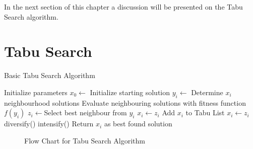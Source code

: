 In the next section of this chapter a discussion will be presented on the Tabu Search algorithm.

\section{Tabu Search}
\label{sec:tabusearch}
\begin{algorithm}
\caption{Basic Tabu Search Algorithm\cite{TabuRCAProblem,TabuMontemanniSmith}}
\label{alg:TS}
	\begin{algorithmic}[1]
		\STATE Initialize parameters
		\STATE $x_0 \leftarrow$ Initialize starting solution
			\STATE $y_i \leftarrow$ Determine $x_i$ neighbourhood solutions 
			\STATE Evaluate neighbouring solutions with fitness function $f(y_i)$
			\STATE $z_i \leftarrow$Select best neighbour from $y_i$
					\STATE $x_i \leftarrow z_i$
				\ENDIF
			\ELSE
				\STATE Add $x_i$ to Tabu List
				\STATE $x_i \leftarrow z_i$
					\STATE diversify()
				\ELSE
					\STATE intensify()
				\ENDIF
			\ENDIF
		\ENDWHILE
		\STATE Return $x_i$ as best found solution
	\end{algorithmic}
\end{algorithm}
\begin{figure}[p!]
	\begin{center}
	\caption{Flow Chart for Tabu Search Algorithm}
	\label{fig:TSAlgorithmFlowChart}
	\end{center}
\end{figure}
